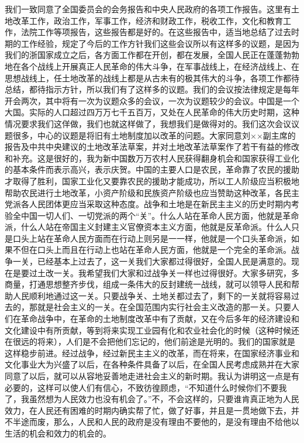 我们一致同意了全国委员会的会务报告和中央人民政府的各项工作报告。这里有土地改革工作，政治工作，军事工作，经济和财政工作，税收工作，文化和教育工作，法院工作等项报告，这些报告都是好的。在这些报告中，适当地总结了过去时期的工作经验，规定了今后的工作方针我们这些会议所以有这样多的议题，是因为我们的浙国家成立之后，各方面工作都在开创，都在发展，全国人民正在蓬蓬勃勃地在各个战线上开展真正人民革命的伟大斗争，在军事战线上，在经济战线上、在思想战线上，任土地改革的战线上都是从古未有的极其伟大的斗争，各项工作都待总结，都待指示方针，所以我们有了这样多的议题。我们的会议按法律规定是每年开会两次，其中将有一次为议题众多的会议，一次为议题较少的会议。中国是一个大国。实际的人口超过四万万七千五百万，又处在人民革命的伟大历史时期，这种情况要求我们这佯做，我们也就这样做了，我想我们是做得对的。我们这次会议议题很多，中心的议题是将旧有土地制度加以改革的问题。大家同意刘××副主席的报告及中共中央建议的土地改革法草案，并对土地改革法草案作了若干有益的修改和补充。这是很好的，我为新中国数万万农村人民获得翻身机会和国家获得工业化的基本条件而表示高兴，表示庆贺。中国的主要人口是农民，革命靠了农民的援助才取得了胜利，国家工业化又要靠农民的援助才能成功，所以工人阶级应当积极地帮助农民进行土地改革，小资产阶级和民族资产阶级也应当赞助这种改革，各民主党派各人民团体更应当采取这种态度。战争和土地是在新民主主义的历史时期内考验全中国一切人们、一切党派的两个“关”。什么人站在革命人民方面，他就是革命派，什么人站在帝国主义封建主义官僚资本主义方面，他就是反革命派。什么人只是口头上站在革命人民方面而在行动上则另是一一样，他就是一个口头革命派，如果不但在口头上而且在行动上也站在革命人民方面，他就是一个完全的革命派。战争一关，已经基本上过去了，这一关我们大家都过得很好，全国人民是满意的。现在是要过土改一关。我希望我们大家和过战争关一样也过得很好。大家多研究，多商量，打通思想整齐步伐，组成一条伟大的反封建统一战线，就可以领导人民和帮助人民顺利地通过这一关。只要战争关、土地关都过去了，剩下的一关就将容易过去的，那就是社会主义的一关。在全国范围内实行社会主义改造的那一关。只要人们在革命战争中，在革命的土地制度改革中有了贡献，又在今后多年的经济建设和文化建设中有所贡献，等到将来实现工业园有化和农业社会化的时候（这种时候还在很远的将来），人们是不会把他们忘记的，他们前途是光明的。我们的国家就是这样稳步前进。经过战争，经过新民主主义的改革，而在将来，在国家经济事业和文化事业大为兴盛了以后，在各种条件具备了以后，在全国人民考虑成熟并在大家同意了以后，就可以从容地妥善地走进社会主义的新时期。我认为讲明这一点是有必要的，这样可以使人们有信心，不致彷徨顾虑，“不知道什么时候你们不要我了，我虽然想为人民效力也没有机会了。”不，不会这样的，只要谁肯真正地为人民效力，在人民还有困难的时期内确实帮了忙，做了好事，并且是一贯地做下去，并不半途而废，那么，人民和人民的政府是没有理由不要他的，是没有理由不给他以生活的机会和效力的机会的。


